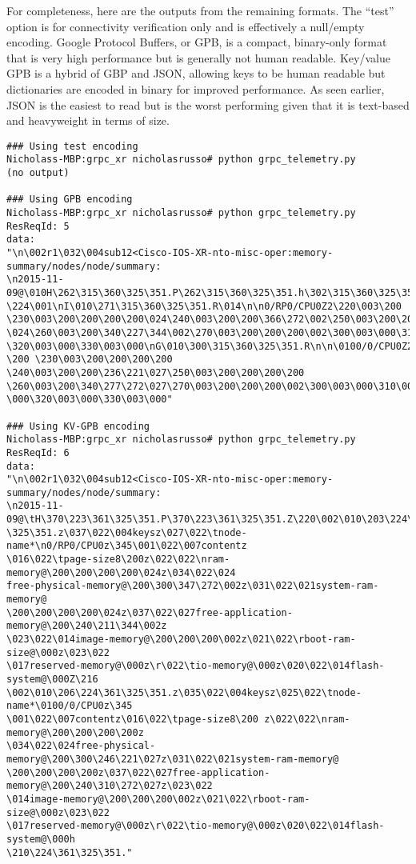 For completeness, here are the outputs from the remaining formats. The ``test''
option is for connectivity verification only and is effectively a null/empty
encoding. Google Protocol Buffers, or GPB, is a compact, binary-only format
that is very high performance but is generally not human readable. Key/value
GPB is a hybrid of GBP and JSON, allowing keys to be human readable but
dictionaries are encoded in binary for improved performance. As seen earlier,
JSON is the easiest to read but is the worst performing given that it is
text-based and heavyweight in terms of size.

\begin{verbatim}
### Using test encoding
Nicholass-MBP:grpc_xr nicholasrusso# python grpc_telemetry.py
(no output)

### Using GPB encoding
Nicholass-MBP:grpc_xr nicholasrusso# python grpc_telemetry.py
ResReqId: 5
data:
"\n\002r1\032\004sub12<Cisco-IOS-XR-nto-misc-oper:memory-summary/nodes/node/summary:
\n2015-11-09@\010H\262\315\360\325\351.P\262\315\360\325\351.h\302\315\360\325\351.b
\224\001\nI\010\271\315\360\325\351.R\014\n\n0/RP0/CPU0Z2\220\003\200
\230\003\200\200\200\200\024\240\003\200\200\366\272\002\250\003\200\200\200\200
\024\260\003\200\340\227\344\002\270\003\200\200\200\002\300\003\000\310\003\000
\320\003\000\330\003\000\nG\010\300\315\360\325\351.R\n\n\0100/0/CPU0Z2\220\003
\200 \230\003\200\200\200\200 \240\003\200\200\236\221\027\250\003\200\200\200\200
\260\003\200\340\277\272\027\270\003\200\200\200\002\300\003\000\310\003
\000\320\003\000\330\003\000"

### Using KV-GPB encoding
Nicholass-MBP:grpc_xr nicholasrusso# python grpc_telemetry.py
ResReqId: 6
data:
"\n\002r1\032\004sub12<Cisco-IOS-XR-nto-misc-oper:memory-summary/nodes/node/summary:
\n2015-11-09@\tH\370\223\361\325\351.P\370\223\361\325\351.Z\220\002\010\203\224\361
\325\351.z\037\022\004keysz\027\022\tnode-name*\n0/RP0/CPU0z\345\001\022\007contentz
\016\022\tpage-size8\200z\022\022\nram-memory@\200\200\200\200\024z\034\022\024
free-physical-memory@\200\300\347\272\002z\031\022\021system-ram-memory@
\200\200\200\200\024z\037\022\027free-application-memory@\200\240\211\344\002z
\023\022\014image-memory@\200\200\200\002z\021\022\rboot-ram-size@\000z\023\022
\017reserved-memory@\000z\r\022\tio-memory@\000z\020\022\014flash-system@\000Z\216
\002\010\206\224\361\325\351.z\035\022\004keysz\025\022\tnode-name*\0100/0/CPU0z\345
\001\022\007contentz\016\022\tpage-size8\200 z\022\022\nram-memory@\200\200\200\200z
\034\022\024free-physical-memory@\200\300\246\221\027z\031\022\021system-ram-memory@
\200\200\200\200z\037\022\027free-application-memory@\200\240\310\272\027z\023\022
\014image-memory@\200\200\200\002z\021\022\rboot-ram-size@\000z\023\022
\017reserved-memory@\000z\r\022\tio-memory@\000z\020\022\014flash-system@\000h
\210\224\361\325\351."
\end{verbatim}

